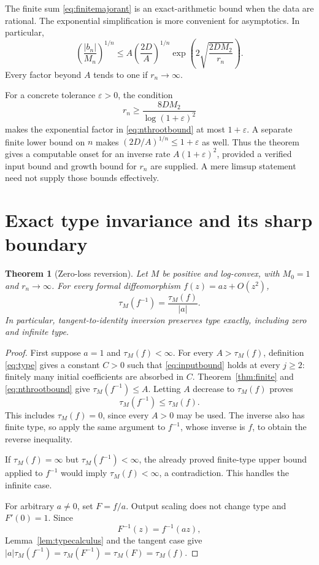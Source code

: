 \documentclass[11pt,a4paper]{article}
\numberwithin{equation}{section}
\newtheorem{theorem}{Theorem}[section]
\theoremstyle{definition}
\theoremstyle{remark}
\newcommand{\typ}{\tau_M}
\begin{document}
The finite sum \eqref{eq:finitemajorant} is an exact-arithmetic bound when
the data are rational. The exponential simplification is more convenient
for asymptotics. In particular,
\begin{equation}
 \left(\frac{|b_n|}{M_n}\right)^{1/n}
 \le A\left(\frac{2D}{A}\right)^{1/n}
       \exp\left(2\sqrt{\frac{2DM_2}{r_n}}\right).
 \label{eq:nthrootbound}
\end{equation}
Every factor beyond $A$ tends to one if $r_n\to\infty$.

For a concrete tolerance $\varepsilon>0$, the condition
\[
 r_n\ge\frac{8DM_2}{\log(1+\varepsilon)^2}
\]
makes the exponential factor in \eqref{eq:nthrootbound} at most
$1+\varepsilon$. A separate finite lower bound on $n$ makes
$(2D/A)^{1/n}\le1+\varepsilon$ as well. Thus the theorem gives a
computable onset for an inverse rate $A(1+\varepsilon)^2$, provided a
verified input bound and growth bound for $r_n$ are supplied. A mere
limsup statement need not supply those bounds effectively.

\section{Exact type invariance and its sharp boundary}
\label{sec:invariance}

\begin{theorem}[Zero-loss reversion]
\label{thm:zeroloss}
Let $M$ be positive and log-convex, with $M_0=1$ and $r_n\to\infty$.
For every formal diffeomorphism $f(z)=az+O(z^2)$,
\begin{equation}
 \boxed{\displaystyle
 \typ(f^{-1})=\frac{\typ(f)}{|a|}.}
 \label{eq:zeroloss}
\end{equation}
In particular, tangent-to-identity inversion preserves type exactly,
including zero and infinite type.
\end{theorem}
\begin{proof}
First suppose $a=1$ and $\typ(f)<\infty$. For every $A>\typ(f)$,
definition \eqref{eq:type} gives a constant $C>0$ such that
\eqref{eq:inputbound} holds at every $j\ge2$: finitely many initial
coefficients are absorbed in $C$. Theorem~\ref{thm:finite} and
\eqref{eq:nthrootbound} give $\typ(f^{-1})\le A$. Letting $A$ decrease
to $\typ(f)$ proves
\[
 \typ(f^{-1})\le\typ(f).
\]
This includes $\typ(f)=0$, since every $A>0$ may be used. The inverse
also has finite type, so apply the same argument to $f^{-1}$, whose
inverse is $f$, to obtain the reverse inequality.

If $\typ(f)=\infty$ but $\typ(f^{-1})<\infty$, the already proved
finite-type upper bound applied to $f^{-1}$ would imply
$\typ(f)<\infty$, a contradiction. This handles the infinite case.

For arbitrary $a\ne0$, set $F=f/a$. Output scaling does not change
type and $F'(0)=1$. Since
\[
 F^{-1}(z)=f^{-1}(az),
\]
Lemma~\ref{lem:typecalculus} and the tangent case give
$|a|\typ(f^{-1})=\typ(F^{-1})=\typ(F)=\typ(f)$.
\end{proof}
\end{document}
